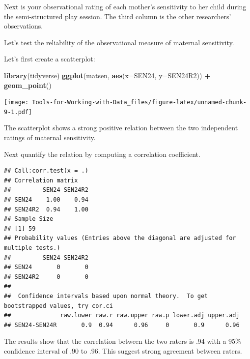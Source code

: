 \documentclass[
]{book}
\newenvironment{Shaded}{\begin{snugshade}}{\end{snugshade}}
\newcommand{\DataTypeTok}[1]{\textcolor[rgb]{0.13,0.29,0.53}{#1}}
\newcommand{\KeywordTok}[1]{\textcolor[rgb]{0.13,0.29,0.53}{\textbf{#1}}}
\newcommand{\NormalTok}[1]{#1}
\newcommand{\OperatorTok}[1]{\textcolor[rgb]{0.81,0.36,0.00}{\textbf{#1}}}
\newcommand{\OtherTok}[1]{\textcolor[rgb]{0.56,0.35,0.01}{#1}}
\newcommand{\StringTok}[1]{\textcolor[rgb]{0.31,0.60,0.02}{#1}}
\begin{document}
Next is your observational rating of each mother's sensitivity to her child during the semi-structured play session. The third column is the other researchers' observations.

Let's test the reliability of the observational measure of maternal sensitivity.

Let's first create a scatterplot:

\begin{Shaded}
\begin{Highlighting}[]
\KeywordTok{library}\NormalTok{(tidyverse)}
\KeywordTok{ggplot}\NormalTok{(matsen, }\KeywordTok{aes}\NormalTok{(}\DataTypeTok{x=}\NormalTok{SEN24, }\DataTypeTok{y=}\NormalTok{SEN24R2)) }\OperatorTok{+}
\StringTok{  }\KeywordTok{geom_point}\NormalTok{()}
\end{Highlighting}
\end{Shaded}

\texttt{[image: Tools-for-Working-with-Data\_files/figure-latex/unnamed-chunk-9-1.pdf]}

The scatterplot shows a strong positive relation between the two independent ratings of maternal sensitivity.

Next quantify the relation by computing a correlation coefficient.

\begin{Shaded}
\end{Shaded}

\begin{verbatim}
## Call:corr.test(x = .)
## Correlation matrix 
##         SEN24 SEN24R2
## SEN24    1.00    0.94
## SEN24R2  0.94    1.00
## Sample Size 
## [1] 59
## Probability values (Entries above the diagonal are adjusted for multiple tests.) 
##         SEN24 SEN24R2
## SEN24       0       0
## SEN24R2     0       0
## 
##  Confidence intervals based upon normal theory.  To get bootstrapped values, try cor.ci
##              raw.lower raw.r raw.upper raw.p lower.adj upper.adj
## SEN24-SEN24R       0.9  0.94      0.96     0       0.9      0.96
\end{verbatim}

The results show that the correlation between the two raters is .94 with a 95\% confidence interval of .90 to .96. This suggest strong agreement between raters.
\end{document}
